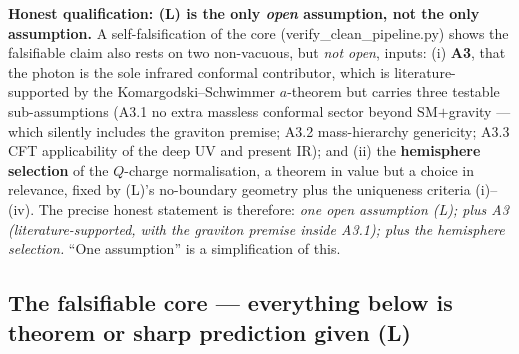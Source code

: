 \textbf{Honest qualification: (L) is the only \emph{open} assumption, not the
only assumption.} A self-falsification of the core (verify\_clean\_pipeline.py)
shows the falsifiable claim also rests on two non-vacuous, but \emph{not open},
inputs: (i) \textbf{A3}, that the photon is the sole infrared conformal
contributor, which is literature-supported by the Komargodski--Schwimmer
$a$-theorem but carries three testable sub-assumptions (A3.1 no extra massless
conformal sector beyond SM$+$gravity --- which silently includes the graviton
premise; A3.2 mass-hierarchy genericity; A3.3 CFT applicability of the deep UV
and present IR); and (ii) the \textbf{hemisphere selection} of the $Q$-charge
normalisation, a theorem in value but a choice in relevance, fixed by (L)'s
no-boundary geometry plus the uniqueness criteria (i)--(iv). The precise honest
statement is therefore: \emph{one open assumption (L); plus A3
(literature-supported, with the graviton premise inside A3.1); plus the
hemisphere selection.} ``One assumption'' is a simplification of this.

\subsection*{The falsifiable core --- everything below is theorem or sharp prediction given (L)}

